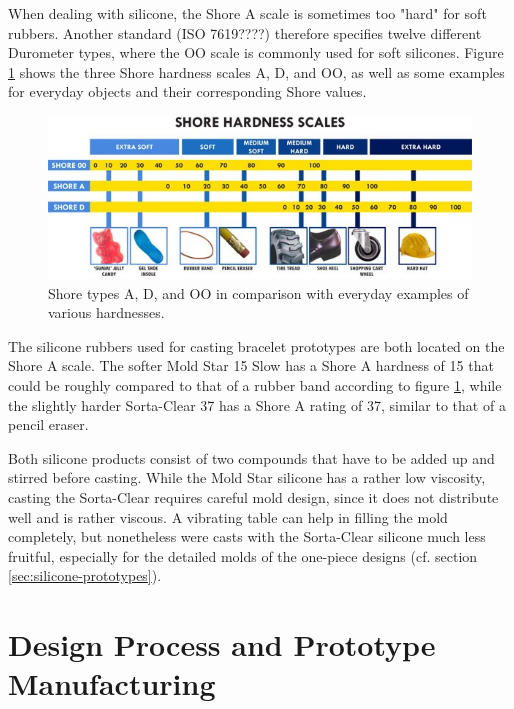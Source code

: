 When dealing with silicone, the Shore A scale is sometimes too "hard" for soft rubbers. Another standard (ISO 7619????) therefore specifies twelve different Durometer types, where the OO scale is commonly used for soft silicones. Figure \ref{fig:shore} shows the three Shore hardness scales A, D, and OO, as well as some examples for everyday objects and their corresponding Shore values.

\begin{figure}[bth]
	\includegraphics[width=\linewidth]{gfx/durometer}
	\caption[Shore hardness scales and everyday examples]{Shore types A, D, and OO in comparison with everyday examples of various hardnesses.\cite{smoothon-web}}\label{fig:shore}
\end{figure}

The silicone rubbers used for casting bracelet prototypes are both located on the Shore A scale. The softer Mold Star 15 Slow has a Shore A hardness of 15 that could be roughly compared to that of a rubber band according to figure \ref{fig:shore}, while the slightly harder Sorta-Clear 37 has a Shore A rating of 37, similar to that of a pencil eraser.%

Both silicone products consist of two compounds that have to be added up and stirred before casting. While the Mold Star silicone has a rather low viscosity, casting the Sorta-Clear requires careful mold design, since it does not distribute well and is rather viscous. A vibrating table can help in filling the mold completely, but nonetheless were casts with the Sorta-Clear silicone much less fruitful, especially for the detailed molds of the one-piece designs (cf. section \ref{sec:silicone-prototypes}). %

\section{Design Process and Prototype Manufacturing}

